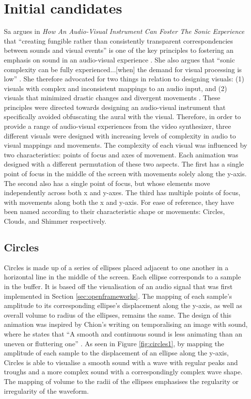 \documentclass[../initial_thesis.tex]{subfiles}
\begin{document}
\section{Initial candidates} \label{sec:initialcandidates}
Sa argues in \textit{How An Audio-Visual Instrument Can Foster The Sonic Experience} that ``creating fungible rather than consistently transparent correspondencies between sounds and visual events'' is one of the key principles to fostering an emphasis on sound in an audio-visual experience \cite{Sa2013}. She also argues that ``sonic complexity can be fully experienced...[when] the demand for visual processing is low'' \cite{Sa2013}. She therefore advocated for two things in relation to designing visuals: (1) visuals with complex and inconsistent mappings to an audio input, and (2) visuals that minimized drastic changes and divergent movements \cite{Sa2013}. These principles were directed towards designing an audio-visual instrument that specifically avoided obfuscating the aural with the visual. Therefore, in order to provide a range of audio-visual experiences from the video synthesizer, three different visuals were designed with increasing levels of complexity in audio to visual mappings and movements. The complexity of each visual was influenced by two characteristics: points of focus and axes of movement. Each animation was designed with a different permutation of these two aspects. The first has a single point of focus in the middle of the screen with movements solely along the y-axis. The second also has a single point of focus, but whose elements move independently across both x and y-axes. The third has multiple points of focus, with movements along both the x and y-axis. For ease of reference, they have been named according to their characteristic shape or movements: Circles, Clouds, and Shimmer respectively.

\subsection{Circles}
Circles is made up of a series of ellipses placed adjacent to one another in a horizontal line in the middle of the screen. Each ellipse corresponds to a sample in the buffer. It is based off the visualisation of an audio signal that was first implemented in Section \ref{sec:openframeworks}. The mapping of each sample's amplitude to its corresponding ellipse's displacement along the y-axis, as well as overall volume to radius of the ellipses, remains the same. The design of this animation was inspired by Chion's writing on temporalising an image with sound, where he states that ``A smooth and continuous sound is less animating than an uneven or fluttering one'' \cite{Chion1994}. As seen in Figure \ref{fig:circles1}, by mapping the amplitude of each sample to the displacement of an ellipse along the y-axis, Circles is able to visualise a smooth sound with a wave with regular peaks and troughs and a more complex sound with a correspondingly complex wave shape. The mapping of volume to the radii of the ellipses emphasises the regularity or irregularity of the waveform.
\end{document}
